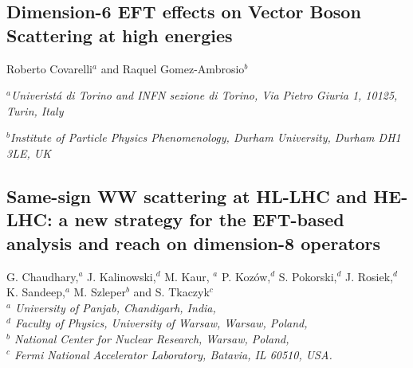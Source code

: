 \documentclass[../report.tex]{subfiles}
\providecommand{\main}{..}
\begin{document}

\subsection{Dimension-6 EFT effects on Vector Boson Scattering at high energies}

\begin{center}
\bigskip\vspace{1cm}
{Roberto Covarelli$^{a}$ and  Raquel Gomez-Ambrosio$^{b}$}
\centerline{$^a${\it Univerist\'a di Torino and INFN sezione di Torino, Via Pietro Giuria 1, 10125, Turin, Italy}}
\centerline{$^b${\it Institute of Particle Physics Phenomenology, Durham University, Durham DH1 3LE, UK}}
\end{center}



\subsection{ Same-sign WW scattering at HL-LHC and HE-LHC: a new strategy for the EFT-based analysis and reach on dimension-8 operators}\label{sect-ssWW}
\begin{center}
 {G. Chaudhary,$^a$ 
 J. Kalinowski,$^{d} $
 M. Kaur, $^a$
P. Koz{\'o}w,$^d$ S. Pokorski,$^d$
J. Rosiek,$^d$ 
K. Sandeep,$^a$
M. Szleper$^b$ 
and
S. Tkaczyk$^c$\\
}
 {\small \it
$^a$ University of Panjab, Chandigarh, India,\\
 $^d$ Faculty of Physics, University of Warsaw, Warsaw,  Poland, \\
$^b$ National Center for Nuclear Research,  Warsaw, Poland, \\
$^c$  Fermi National Accelerator Laboratory, Batavia, IL 60510, USA.}
\end{center}


\end{document}
